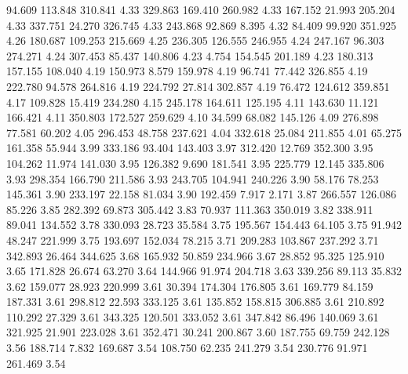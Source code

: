   94.609  113.848  310.841         4.33
 329.863  169.410  260.982         4.33
 167.152   21.993  205.204         4.33
 337.751   24.270  326.745         4.33
 243.868   92.869    8.395         4.32
  84.409   99.920  351.925         4.26
 180.687  109.253  215.669         4.25
 236.305  126.555  246.955         4.24
 247.167   96.303  274.271         4.24
 307.453   85.437  140.806         4.23
   4.754  154.545  201.189         4.23
 180.313  157.155  108.040         4.19
 150.973    8.579  159.978         4.19
  96.741   77.442  326.855         4.19
 222.780   94.578  264.816         4.19
 224.792   27.814  302.857         4.19
  76.472  124.612  359.851         4.17
 109.828   15.419  234.280         4.15
 245.178  164.611  125.195         4.11
 143.630   11.121  166.421         4.11
 350.803  172.527  259.629         4.10
  34.599   68.082  145.126         4.09
 276.898   77.581   60.202         4.05
 296.453   48.758  237.621         4.04
 332.618   25.084  211.855         4.01
  65.275  161.358   55.944         3.99
 333.186   93.404  143.403         3.97
 312.420   12.769  352.300         3.95
 104.262   11.974  141.030         3.95
 126.382    9.690  181.541         3.95
 225.779   12.145  335.806         3.93
 298.354  166.790  211.586         3.93
 243.705  104.941  240.226         3.90
  58.176   78.253  145.361         3.90
 233.197   22.158   81.034         3.90
 192.459    7.917    2.171         3.87
 266.557  126.086   85.226         3.85
 282.392   69.873  305.442         3.83
  70.937  111.363  350.019         3.82
 338.911   89.041  134.552         3.78
 330.093   28.723   35.584         3.75
 195.567  154.443   64.105         3.75
  91.942   48.247  221.999         3.75
 193.697  152.034   78.215         3.71
 209.283  103.867  237.292         3.71
 342.893   26.464  344.625         3.68
 165.932   50.859  234.966         3.67
  28.852   95.325  125.910         3.65
 171.828   26.674   63.270         3.64
 144.966   91.974  204.718         3.63
 339.256   89.113   35.832         3.62
 159.077   28.923  220.999         3.61
  30.394  174.304  176.805         3.61
 169.779   84.159  187.331         3.61
 298.812   22.593  333.125         3.61
 135.852  158.815  306.885         3.61
 210.892  110.292   27.329         3.61
 343.325  120.501  333.052         3.61
 347.842   86.496  140.069         3.61
 321.925   21.901  223.028         3.61
 352.471   30.241  200.867         3.60
 187.755   69.759  242.128         3.56
 188.714    7.832  169.687         3.54
 108.750   62.235  241.279         3.54
 230.776   91.971  261.469         3.54
